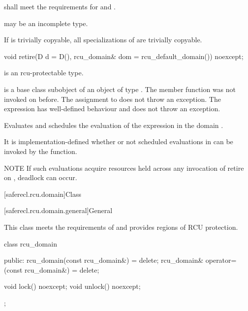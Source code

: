 {} shall meet the requirements for
 and .

{} may be an incomplete type.

If  is trivially copyable, all specializations of
 are trivially copyable.

\begin{itemdecl}
void retire(D d = D(), rcu_domain& dom = rcu_default_domain()) noexcept;
\end{itemdecl}

\begin{itemdescr}

\mandates
{} is an rcu-protectable type.

\expects
{} is a base class subobject of
an object  of type . The member function
 was not invoked on 
before. The assignment to  does not throw an
exception. The expression  has
well-defined behaviour and does not throw an exception.

\effects
Evaluates  and schedules
the evaluation of the expression  in the domain .

\remarks
It is implementation-defined whether or not scheduled
evaluations in  can be invoked by the 
function.

NOTE
If such evaluations acquire resources held across any invocation of
retire on , deadlock can occur.

\end{itemdescr}

[saferecl.rcu.domain]{Class }

[saferecl.rcu.domain.general]{General}


This class meets the requirements of   and provides regions of RCU protection.

\begin{codeblock}
class rcu_domain {
public:
  rcu_domain(const rcu_domain&) = delete;
  rcu_domain& operator=(const rcu_domain&) = delete;

  void lock() noexcept;
  void unlock() noexcept;
};
\end{codeblock}

